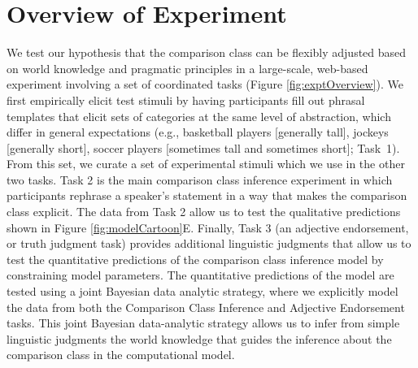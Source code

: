 \documentclass[doc]{apa6}
\begin{document}
%  



\section{Overview of Experiment}


We test our hypothesis that the comparison class can be flexibly adjusted based on world knowledge and pragmatic principles in a large-scale, web-based experiment involving a set of coordinated tasks (Figure \ref{fig:exptOverview}).
We first empirically elicit test stimuli by having participants fill out phrasal templates that elicit sets of categories at the same level of abstraction, which differ in general expectations (e.g., basketball players [generally tall], jockeys [generally short], soccer players [sometimes tall and sometimes short]; Task~1). 
From this set, we curate a set of experimental stimuli which we use in the other two tasks.
Task 2 is the main comparison class inference experiment in which participants rephrase a speaker's statement in a way that makes the comparison class explicit.
The data from Task 2 allow us to test the qualitative predictions shown in Figure \ref{fig:modelCartoon}E.
Finally, Task 3 (an adjective endorsement, or truth judgment task) provides additional linguistic judgments that allow us to test the quantitative predictions of the comparison class inference model by constraining model parameters. 
The quantitative predictions of the model are tested using a joint Bayesian data analytic strategy, where we explicitly model the data from both the Comparison Class Inference and Adjective Endorsement tasks.
This joint Bayesian data-analytic strategy allows us to infer from simple linguistic judgments the world knowledge that guides the inference about the comparison class in the computational model. 
\end{document}
